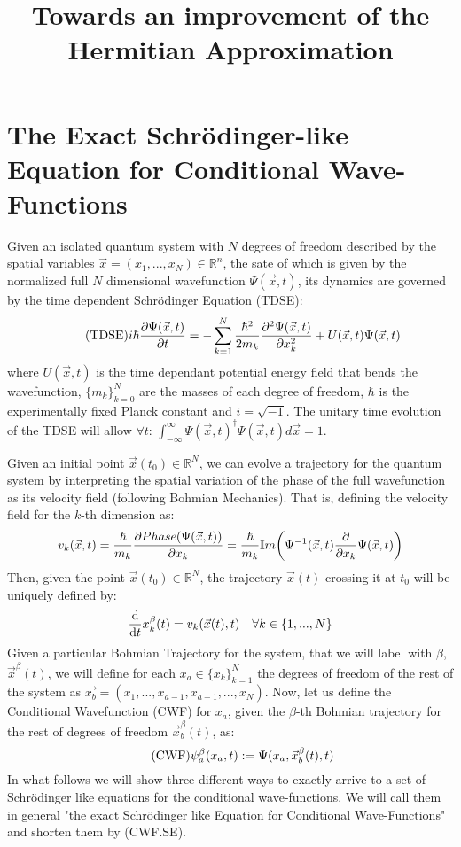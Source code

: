 \documentclass[11pt, a4paper]{article} %
\title{\vspace{-1.0cm} {\bf Towards an improvement of the Hermitian Approximation } \vspace{0.2cm} \\ }
\date{\vspace{-11ex}}
\newcommand{\R}{\mathbb{R}} %
\begin{document}
\maketitle
\tableofcontents

\clearpage
\setcounter{page}{1}
\vspace{-0.3 cm}
\section{The Exact Schrödinger-like Equation for Conditional Wave-Functions}

Given an isolated quantum system with $N$ degrees of freedom described by the spatial variables $\vec{x}=(x_1,...,x_N)\in \R^n$, the sate of which is given by the normalized full $N$ dimensional wavefunction $\Psi(\vec{x},t)$, its dynamics are governed by the time dependent Schrödinger Equation (TDSE):
\begin{equation}\label{TDSE}\tag{TDSE}
i\hbar \pdv{\Psi(\vec{x}, t)}{t} = - \sum_{k=1}^{N} \frac{\hbar^2}{2m_k}\pdv[2]{\Psi(\vec{x},t)}{x_k} + U(\vec{x},t)\Psi(\vec{x},t)
\end{equation}
where $U(\vec{x},t)$ is the time dependant potential energy field that bends the wavefunction, $\{m_k\}_{k=0}^N$ are the masses of each degree of freedom, $\hbar$ is the experimentally fixed Planck constant and $i=\sqrt{-1}$. The unitary time evolution of the TDSE will allow $\forall t$: $ \int_{-\infty}^\infty \Psi(\vec{x},t)^\dagger \Psi(\vec{x},t) d\vec{x}=1 $.

Given an initial point $\vec{x}(t_0)\in \R^N$, we can evolve a trajectory for the quantum system by interpreting the spatial variation of the phase of the full wavefunction as its velocity field (following Bohmian Mechanics). That is, defining the velocity field for the $k$-th dimension as:
$$
v_k(\vec{x},t) = \frac{\hbar}{m_k}\pdv{ Phase(\Psi(\vec{x},t))}{x_k}=\frac{\hbar}{m_k}\mathbb{I}m\qty(\Psi^{-1}(\vec{x},t)\pdv{}{x_k}\Psi(\vec{x},t))
$$
Then, given the point $\vec{x}(t_0)\in \R^N$, the trajectory $\vec{x}(t)$ crossing it at $t_0$ will be uniquely defined by:
$$
\dv{}{t}x^\beta_k(t)=v_k(\vec{x}(t),t) \quad \forall k\in \{1,...,N\}\vspace{-0.05 cm}
$$
Given a particular Bohmian Trajectory for the system, that we will label with $\beta$, $\vec{x}^\beta(t)$, we will define for each $x_a\in\{x_k\}_{k=1}^N$ the degrees of freedom of the rest of the system as $\vec{x_b}=(x_1,...,x_{a-1},x_{a+1},...,x_N)$. Now, let us define the Conditional Wavefunction (CWF) for $x_a$, given the $\beta$-th Bohmian trajectory for the rest of degrees of freedom $\vec{x}_b^\beta(t)$, as:
\begin{equation}\label{CWF}\tag{CWF}
\psi_a^\beta(x_a,t) := \Psi(x_a, \vec{x}_b^\beta(t), t)\vspace{-0.05 cm}
\end{equation}
In what follows we will show three different ways to exactly arrive to a set of Schrödinger like equations for the conditional wave-functions. We will call them in general "the exact Schrödinger like Equation for Conditional Wave-Functions" and shorten them by \hypertarget{CWF.SE}{(CWF.SE)}. \vspace{-0.3 cm}
\end{document}
